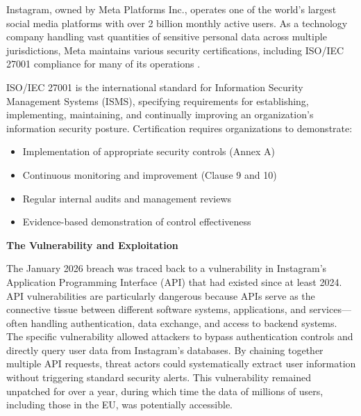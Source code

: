 \documentclass{article}
\begin{document}
Instagram, owned by Meta Platforms Inc., operates one of the world's largest social media platforms with over 2 billion monthly active users. As a technology company handling vast quantities of sensitive personal data across multiple jurisdictions, Meta maintains various security certifications, including ISO/IEC 27001 compliance for many of its operations .

ISO/IEC 27001 is the international standard for Information Security Management Systems (ISMS), specifying requirements for establishing, implementing, maintaining, and continually improving an organization's information security posture. Certification requires organizations to demonstrate:
\begin{itemize}
    \item Implementation of appropriate security controls (Annex A)
    \item Continuous monitoring and improvement (Clause 9 and 10)
    \item Regular internal audits and management reviews
    \item Evidence-based demonstration of control effectiveness
\end{itemize}
\textbf{The Vulnerability and Exploitation}

The January 2026 breach was traced back to a vulnerability in Instagram's Application Programming Interface (API) that had existed since at least 2024. API vulnerabilities are particularly dangerous because APIs serve as the connective tissue between different software systems, applications, and services—often handling authentication, data exchange, and access to backend systems. The specific vulnerability allowed attackers to bypass authentication controls and directly query user data from Instagram's databases. By chaining together multiple API requests, threat actors could systematically extract user information without triggering standard security alerts. This vulnerability remained unpatched for over a year, during which time the data of millions of users, including those in the EU, was potentially accessible.
\end{document}
